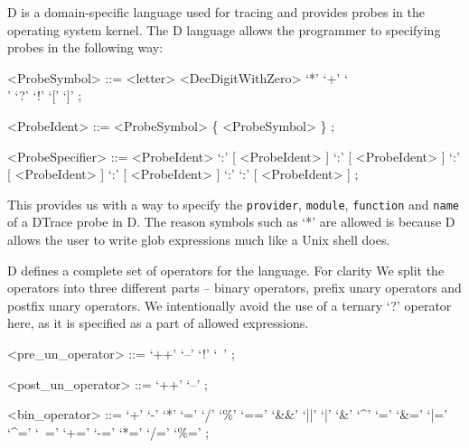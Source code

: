 \noindent
D is a domain-specific language used for tracing and provides probes
in the operating system kernel.  The D language allows the programmer
to specifying probes in the following way:

\begin{grammar}
<ProbeSymbol> ::=  <letter>
              \alt <DecDigitWithZero>
              \alt `*'
              \alt `+'
              \alt `\\'
              \alt `?'
              \alt `!'
              \alt `['
              \alt `]' ;

<ProbeIdent> ::= <ProbeSymbol> \{ <ProbeSymbol> \} ;

<ProbeSpecifier> ::=  <ProbeIdent>
                 \alt [ <ProbeIdent> ] `:' [ <ProbeIdent> ]
                 \alt [ <ProbeIdent> ] `:' [ <ProbeIdent> ] `:' [ <ProbeIdent> ]
                 \alt [ <ProbeIdent> ] `:' [ <ProbeIdent> ] `:' \newline
                      [ <ProbeIdent> ] `:' [ <ProbeIdent> ] ;
\end{grammar}

\noindent
This provides us with a way to specify the \texttt{provider}, \texttt{module},
\texttt{function} and \texttt{name} of a DTrace probe in D. The reason symbols
such as `*' are allowed is because D allows the user to write glob expressions
much like a Unix shell does. \newline

\noindent
D defines a complete set of operators for the language.  For clarity
We split the operators into three different parts -- binary operators,
prefix unary operators and postfix unary operators. We intentionally
avoid the use of a ternary `?' operator here, as it is specified as a
part of allowed expressions.

\begin{grammar}
<pre\_un\_operator> ::=  `++'
                    \alt `--'
                    \alt `!'
                    \alt `~' ;

<post\_un\_operator> ::=  `++'
                     \alt `--' ;

<bin\_operator> ::=  `+'
                \alt `-'
                \alt `*'
                \alt `='
                \alt `/'
                \alt `\%'
                \alt `=='
                \alt `&&'
                \alt `||'
                \alt `|'
                \alt `&'
                \alt `^'
                \alt `='
                \alt `&='
                \alt `|='
                \alt `^='
                \alt `~='
                \alt `+='
                \alt `-='
                \alt `*='
                \alt `/='
                \alt `\%=' ;
\end{grammar}

